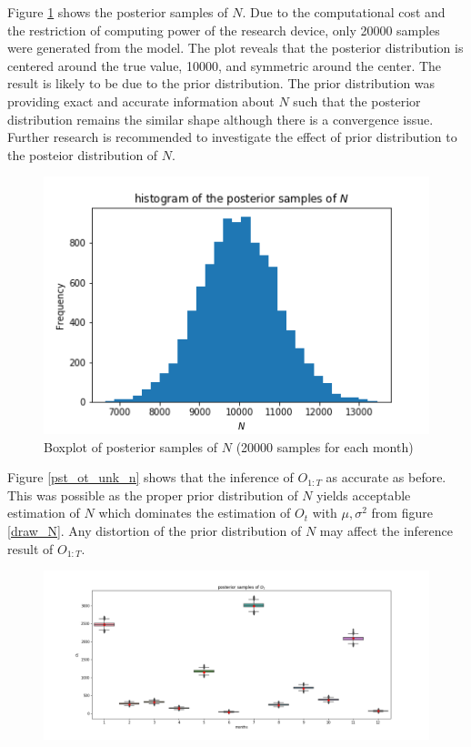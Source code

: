 \documentclass[12pt]{article}
\begin{document}
{Figure \ref{hist_unk_n} shows the posterior samples of $N$. Due to the computational cost and the restriction of computing power of the research device, only 20000 samples were generated from the model. The plot reveals that the posterior distribution is centered around the true value, 10000, and symmetric around the center. The result is likely to be due to the prior distribution. The prior distribution was providing exact and accurate information about $N$ such that the posterior distribution remains the similar shape although there is a convergence issue. Further research is recommended to investigate the effect of prior distribution to the posteior distribution of $N$.	

\begin{figure}[htb]
	\centering
	\includegraphics[width=0.7\linewidth]{Figures/hist_N.png}
	\caption[Unobserved $N$: boxplot of posterior samples of $N$]{Boxplot of posterior samples of $N$ (20000 samples for each month)}
	\label{hist_unk_n}
\end{figure}

Figure \ref{pst_ot_unk_n} shows that the inference of $O_{1:T}$ as accurate as before. This was possible as the proper prior distribution of $N$ yields acceptable estimation of $N$ which dominates the estimation of $O_t$ with $\mu, \sigma^2$ from figure \ref{draw_N}. Any distortion of the prior distribution of $N$ may affect the inference result of $O_{1:T}$.

\begin{figure}[htb]
	\centering
	\includegraphics[width=1\linewidth]{Figures/unknown_N_ot.png}


\end{figure}}
\end{document}
